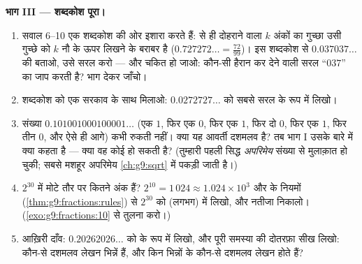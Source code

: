 \begin{problem}
\medskip
\noindent\textbf{भाग III --- शब्दकोश पूरा।}
\begin{enumerate}[resume]
  \item सवाल 6--10 एक शब्दकोश की ओर इशारा करते हैं:  से
        ही दोहराने वाला $k$ अंकों का गुच्छा उसी गुच्छे को $k$ नौ के
        ऊपर लिखने के बराबर है ($0.727272\ldots = \frac{72}{99}$)।
        इस शब्दकोश से $0.037037\ldots$ की  बताओ, उसे सरल
        करो --- और चकित हो जाओ: कौन-सी हैरान कर देने वाली सरल
         ``$037$'' का जाप करती है? भाग देकर जाँचो।
  \item शब्दकोश को एक सरकाव के साथ मिलाओ: $0.0272727\ldots$ को
        सबसे सरल  के रूप में लिखो।
  \item संख्या $0.101001000100001\ldots$ (एक $1$, फिर एक $0$, फिर
        एक $1$, फिर दो $0$, फिर एक $1$, फिर तीन $0$, और ऐसे ही
        आगे) कभी रुकती नहीं। क्या यह आवर्ती दशमलव है? तब भाग I उसके
        बारे में क्या कहता है --- क्या वह कोई  हो सकती है?
        (तुम्हारी पहली सिद्ध \emph{अपरिमेय} संख्या से मुलाक़ात हो
        चुकी; सबसे मशहूर अपरिमेय \cref{ch:g9:sqrt} में पकड़ी जाती
        है।)
  \item $2^{30}$ में मोटे तौर पर कितने अंक हैं?
        $2^{10} = 1\,024 \approx 1.024 \times 10^3$ और  के
        नियमों (\cref{thm:g9:fractions:rules}) से $2^{30}$ को
        (लगभग)  में लिखो, और नतीजा निकालो।
        (\cref{exo:g9:fractions:10} से तुलना करो।)
  \item आख़िरी दाँव: $0.20262026\ldots$ को  के रूप में लिखो,
        और पूरी समस्या की दोतरफ़ा सीख लिखो: कौन-से दशमलव लेखन
        भिन्नें हैं, और किन भिन्नों के कौन-से दशमलव लेखन होते हैं?
\end{enumerate}
\end{problem}

